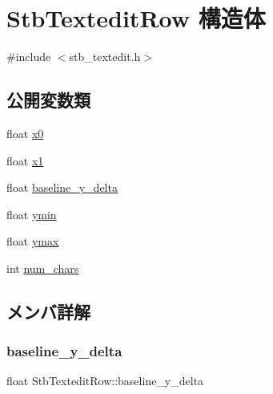 \hypertarget{struct_stb_textedit_row}{}\section{Stb\+Textedit\+Row 構造体}
\label{struct_stb_textedit_row}


{\ttfamily \#include $<$stb\+\_\+textedit.\+h$>$}

\subsection*{公開変数類}
\begin{DoxyCompactItemize}
\item 
float \mbox{\hyperlink{struct_stb_textedit_row_af30b3e1d61d1acea26d3e0ebec2cb81d}{x0}}
\item 
float \mbox{\hyperlink{struct_stb_textedit_row_a3a3e1a506030c871a1b3d09bf26e341f}{x1}}
\item 
float \mbox{\hyperlink{struct_stb_textedit_row_ad2d72b74b1a61e331949c7f7ec311880}{baseline\+\_\+y\+\_\+delta}}
\item 
float \mbox{\hyperlink{struct_stb_textedit_row_a707d331bd9dc99d64c81f71106b75eed}{ymin}}
\item 
float \mbox{\hyperlink{struct_stb_textedit_row_aab290e15f6a3b4a96ab2c2472cc8a7a5}{ymax}}
\item 
int \mbox{\hyperlink{struct_stb_textedit_row_a1a19bebadb3f82b4f86ea29698d77084}{num\+\_\+chars}}
\end{DoxyCompactItemize}


\subsection{メンバ詳解}
\mbox{\label{struct_stb_textedit_row_ad2d72b74b1a61e331949c7f7ec311880}} 
\subsubsection{\texorpdfstring{baseline\+\_\+y\+\_\+delta}{baseline\_y\_delta}}
{\footnotesize\ttfamily float Stb\+Textedit\+Row\+::baseline\+\_\+y\+\_\+delta}

\mbox{\label{struct_stb_textedit_row_a1a19bebadb3f82b4f86ea29698d77084}} 
